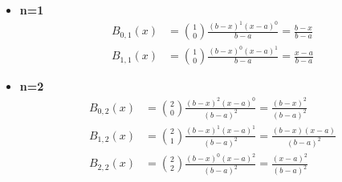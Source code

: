 \documentclass{article}
\begin{document}
\begin{itemize}
    \item \textbf{n=1} 
        \begin{equation*}
           \begin{aligned}
               B_{0,1}(x)&=\binom{1}{0}\frac{(b-x)^1(x-a)^0}{b-a}=\frac{b-x}{b-a}
                \\ 
               B_{1,1}(x)&=\binom{1}{0}\frac{(b-x)^0(x-a)^1}{b-a}=\frac{x-a}{b-a} 
           \end{aligned} 
        \end{equation*}
        \begin{center}
        \end{center}
    \item \textbf{n=2}
        \begin{equation*}
           \begin{aligned}
               B_{0,2}(x)&=\binom{2}{0}\frac{(b-x)^2(x-a)^0}{(b-a)^2}=\frac{(b-x)^2}{(b-a)^2}
               \\ 
               B_{1,2}(x)&=\binom{2}{1}\frac{(b-x)^1(x-a)^1}{(b-a)^2}=\frac{(b-x)(x-a)}{(b-a)^2}
               \\
               B_{2,2}(x)&=\binom{2}{2}\frac{(b-x)^0(x-a)^2}{(b-a)^2}=\frac{(x-a)^2}{(b-a)^2}
           \end{aligned} 
        \end{equation*}
        \begin{center}
        \end{center}
\end{itemize}
\end{document}
